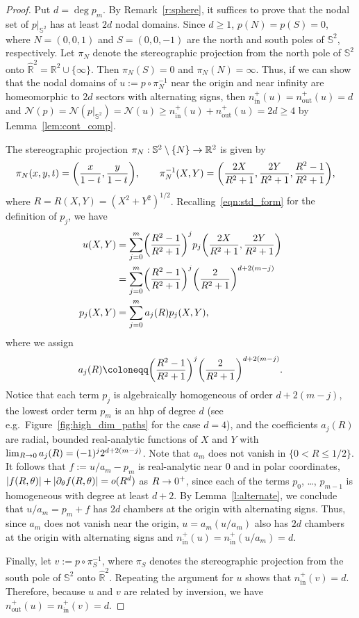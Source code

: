 \documentclass[10pt]{amsart}
\theoremstyle{definition}\newtheorem{defi}[theo]{Definition}\newtheorem{rema}[theo]{Remark}\newtheorem{exam}[theo]{Example}\newtheorem{exem}[theo]{Example}\newtheorem{nota}[theo]{Notation}
\newcommand{\R}{\mathbb{R}}
\newcommand{\sphere}{\mathbb{S}}
\newcommand{\ra}{\to}
\newcommand{\abs}[1]{\left \lvert #1 \right \rvert}
\newcommand{\nin}{n^+_{\mathrm{in}}}
\newcommand{\nout}{n^+_{\mathrm{out}}}
\newcommand{\nodal}{\mathcal{N}}
\renewcommand*{\to}{\mathchoice{\longrightarrow}{\rightarrow}{\rightarrow}{\rightarrow}}
\let\originalleft\left
\let\originalright\right
\renewcommand{\left}{\mathopen{}\mathclose\bgroup\originalleft}
\renewcommand{\right}{\aftergroup\egroup\originalright}
\begin{document}
\begin{proof}
Put $d=\deg p_m$. By Remark~\ref{r:sphere}, it suffices to prove that the nodal set of $p|_{\sphere^2}$ has at least $2d$ nodal domains. Since $d\geq 1$, $p(N)=p(S)=0$, where $N=(0,0,1)$ and $S=(0,0,-1)$ are the north and south poles of $\sphere^2$, respectively. Let $\pi_N$ denote the stereographic projection from the north pole of $\sphere^2$ onto $\widehat{\R}^2=\R^2\cup\{\infty\}$. Then $\pi_N(S)=0$ and $\pi_N(N)=\infty$. Thus, if we can show that the nodal domains of $u:=p\circ \pi_N^{-1}$ near the origin and near infinity are homeomorphic to $2d$ sectors with alternating signs, then $\nin(u)=\nout(u)=d$ and $\nodal(p)=\nodal(p|_{\sphere^2})=\nodal(u)\geq \nin(u)+\nout(u)=2d\geq 4$ by Lemma~\ref{lem:cont_comp}.

The stereographic projection $\pi_N: \sphere^2 \setminus\{N\} \ra \R^2$ is given by
\begin{align*}
\pi_N(x,y,t) & = \left(\frac{x}{1-t}, \frac{y}{1-t} \right), \qquad \pi_N^{-1}(X,Y) = \left(\frac{2X}{R^2+1}, \frac{2Y}{R^2 +1}, \frac{R^2-1}{R^2+1} \right),
\end{align*}
where $R=R(X,Y)=(X^2+Y^2)^{1/2}$. Recalling~\eqref{eqn:std_form} {for the definition of $p_j$}, we have
\begin{equation}
\begin{split}
u(X,Y) &= \sum_{j=0}^m \left(\frac{R^2-1}{R^2+1} \right)^{j} p_j\left(\frac{2X}{R^2+1}, \frac{2Y}{R^2+1} \right)\\
&= \sum_{j=0}^m \left(\frac{R^2-1}{R^2+1} \right)^{j} \left(\frac{2}{R^2+1}\right)^{d+2(m-j)}\\ p_j(X,Y) &= \sum_{j=0}^m a_j(R)p_j(X,Y),
\end{split}
\end{equation}
{where we assign}
\begin{align*}
{a_j(R) \coloneqq \left(\frac{R^2-1}{R^2+1} \right)^{j} \left(\frac{2}{R^2+1}\right)^{d+2(m-j)}.}
\end{align*}
Notice that each term $p_{j}$ is algebraically homogeneous of order $d + 2(m-j)$, the lowest order term $p_m$ is an hhp of degree $d$ (see e.g.~Figure~\ref{fig:high_dim_paths} for the case $d=4$), and the coefficients $a_j(R)$ are radial, bounded real-analytic functions of $X$ and $Y$ with $\lim_{R\to 0} a_j(R) = (-1)^j2^{d+2(m-j)}$. {Note that} $a_m$ does not vanish in $\{0<R\leq 1/2\}$. It follows that $f:=u/a_m-p_m$ is real-analytic near $0$ and in polar coordinates, $|f(R, \theta)| + \abs{\partial_\theta f(R, \theta)} = o(R^d)$ as $R \ra 0^+$, since each of the terms $p_0$, \dots, $p_{m-1}$ is homogeneous with degree at least $d+2$. By Lemma~\ref{l:alternate}, we conclude that $u/a_m=p_m+f$ has $2d$ chambers at the origin with alternating signs. Thus, since $a_m$ does not vanish near the origin, $u=a_m(u/a_m)$ also has $2d$ chambers at the origin with alternating signs and $\nin(u)=\nin(u/a_m)=d$.

Finally, let $v:=p\circ \pi_S^{-1}$, where $\pi_S$ denotes the stereographic projection from the south pole of $\sphere^2$ onto $\widehat{\R}^2$. Repeating the argument for $u$ shows that $\nin(v)=d$. Therefore, because $u$ and $v$ are related by inversion, we have $\nout(u)=\nin(v)=d$.
\end{proof}
\end{document}

